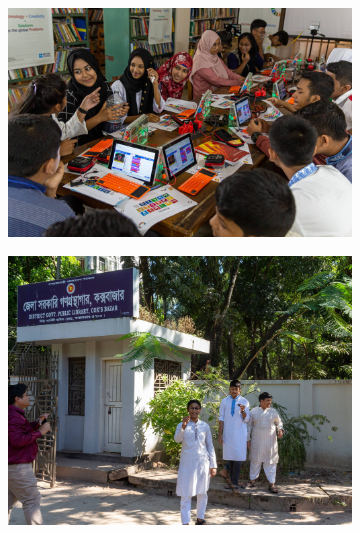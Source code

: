 \documentclass[12pt]{report} %
\begin{document}
\begin{figure}[t!]
    \centering
    \begin{subfigure}[]{0.46\textwidth}
        \centering
        \includegraphics[width=1.0\textwidth]{dyb_coxsbazar_s_22}
    \end{subfigure}
    \begin{subfigure}[]{0.46\textwidth}
        \centering
        \includegraphics[width=1.0\textwidth]{dyb_coxsbazar_s_17}
    \end{subfigure}


\end{figure}
\end{document}
